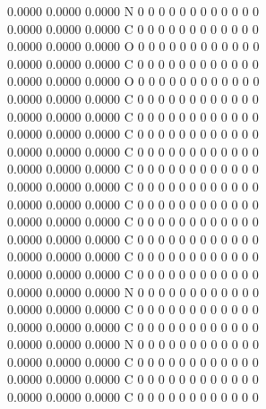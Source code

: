 \documentclass[11pt,titlepage,dvipdfmx,twoside]{article}
\begin{document}
\begin{oframed}
{    0.0000    0.0000    0.0000  N  0  0  0  0  0  0  0  0  0  0  0  0      \\
    0.0000    0.0000    0.0000  C  0  0  0  0  0  0  0  0  0  0  0  0      \\
    0.0000    0.0000    0.0000  O  0  0  0  0  0  0  0  0  0  0  0  0      \\
    0.0000    0.0000    0.0000  C  0  0  0  0  0  0  0  0  0  0  0  0      \\
    0.0000    0.0000    0.0000  O  0  0  0  0  0  0  0  0  0  0  0  0      \\
    0.0000    0.0000    0.0000  C  0  0  0  0  0  0  0  0  0  0  0  0      \\
    0.0000    0.0000    0.0000  C  0  0  0  0  0  0  0  0  0  0  0  0      \\
    0.0000    0.0000    0.0000  C  0  0  0  0  0  0  0  0  0  0  0  0      \\
    0.0000    0.0000    0.0000  C  0  0  0  0  0  0  0  0  0  0  0  0      \\
    0.0000    0.0000    0.0000  C  0  0  0  0  0  0  0  0  0  0  0  0      \\
    0.0000    0.0000    0.0000  C  0  0  0  0  0  0  0  0  0  0  0  0      \\
    0.0000    0.0000    0.0000  C  0  0  0  0  0  0  0  0  0  0  0  0      \\
    0.0000    0.0000    0.0000  C  0  0  0  0  0  0  0  0  0  0  0  0      \\
    0.0000    0.0000    0.0000  C  0  0  0  0  0  0  0  0  0  0  0  0      \\
    0.0000    0.0000    0.0000  C  0  0  0  0  0  0  0  0  0  0  0  0      \\
    0.0000    0.0000    0.0000  C  0  0  0  0  0  0  0  0  0  0  0  0      \\
    0.0000    0.0000    0.0000  N  0  0  0  0  0  0  0  0  0  0  0  0      \\
    0.0000    0.0000    0.0000  C  0  0  0  0  0  0  0  0  0  0  0  0      \\
    0.0000    0.0000    0.0000  C  0  0  0  0  0  0  0  0  0  0  0  0      \\
    0.0000    0.0000    0.0000  N  0  0  0  0  0  0  0  0  0  0  0  0      \\
    0.0000    0.0000    0.0000  C  0  0  0  0  0  0  0  0  0  0  0  0      \\
    0.0000    0.0000    0.0000  C  0  0  0  0  0  0  0  0  0  0  0  0      \\
    0.0000    0.0000    0.0000  C  0  0  0  0  0  0  0  0  0  0  0  0      \\
}
\end{oframed}
\end{document}
